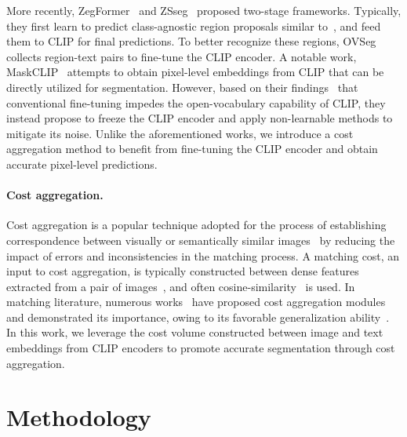 \documentclass[10pt,twocolumn,letterpaper]{article}
\begin{document}
More recently, ZegFormer~\cite{ding2022decoupling} and ZSseg~\cite{xu2022simple} proposed two-stage frameworks. Typically, they first learn to predict class-agnostic region proposals similar to~\cite{ghiasi2022scaling}, and feed them to CLIP for final predictions. To better recognize these regions, OVSeg~\cite{liang2022open} collects region-text pairs to fine-tune the CLIP encoder. A notable work, MaskCLIP~\cite{zhou2022extract} attempts to obtain pixel-level embeddings from CLIP that can be directly utilized for segmentation. However, based on their findings~\cite{zhou2022extract} that conventional fine-tuning impedes the open-vocabulary capability of CLIP, they instead propose to freeze the CLIP encoder and apply non-learnable methods to mitigate its noise. Unlike the aforementioned works, we introduce a cost aggregation method to benefit from fine-tuning the CLIP encoder and obtain accurate pixel-level predictions.



\vspace{-10pt}
\paragraph{Cost aggregation.} Cost aggregation is a popular technique adopted for the process of establishing correspondence between visually or semantically similar images~\cite{kendall2017end,guo2019group,yang2019hierarchical,cho2021cats,hong2022cost} by reducing the impact of errors and inconsistencies in the matching process. A matching cost, an input to cost aggregation, is typically constructed between dense features extracted from a pair of images~\cite{rocco2017convolutional}, and often cosine-similarity~\cite{liu2022graftnet,rocco2017convolutional} is used. In matching literature, numerous works~\cite{kendall2017end, chang2018pyramid, guo2019group, yang2019hierarchical, song2021adastereo,hong2022neural,huang2022flowformer,cho2022cats++} have proposed cost aggregation modules and demonstrated its importance, owing to its favorable generalization ability~\cite{song2021adastereo,liu2022graftnet}. In this work, we leverage the cost volume constructed between image and text embeddings from CLIP encoders to promote accurate segmentation through cost aggregation.

 
\section{Methodology}
\end{document}
